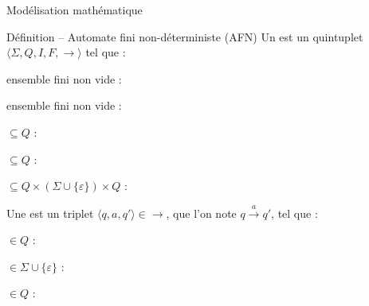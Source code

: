 
\begingroup

\begin{frame}{Modélisation mathématique}

  \begin{block}{Définition -- Automate fini non-déterministe (AFN)}
    \vspace{3mm}
    Un  est un quintuplet \alert{$\langle \Sigma, Q, I, F, \rightarrow \rangle$} tel que :
    \begin{description}[xxxxx]
    \item[\alert{$\Sigma$}] ensemble fini non vide : 
    \item[\alert{$Q$}] ensemble fini non vide : 
    \item[\alert{$I$}] $\subseteq Q$ : 
    \item[\alert{$F$}] $\subseteq Q$ : 
    \item[\alert{$\rightarrow$}] $\subseteq  Q \times (\Sigma \cup \{\varepsilon\}) \times Q$ : 
    \end{description}

    \vspace{3mm}
    Une  est un triplet \alert{$\langle q, a, q' \rangle \in \rightarrow$}, que l'on note \alert{$q\xrightarrow{a} q'$}, tel que :
    \begin{description}[xxxxx]
    \item[\alert{$q$}] $\in Q$ : 
    \item[\alert{$a$}] $\in \Sigma \cup \{\varepsilon\}$ : 
    \item[\alert{$q'$}] $\in Q$ : 
    \end{description}
  \end{block}


\end{frame}

\endgroup
\endinput

